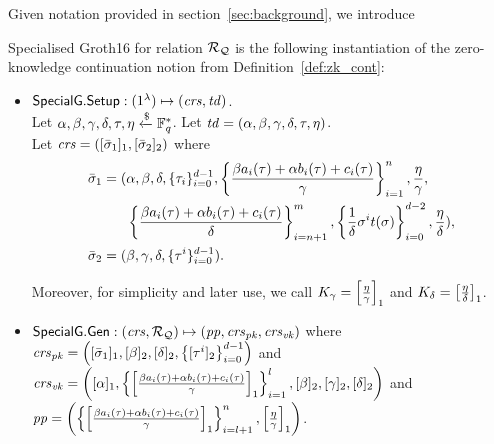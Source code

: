 \noindent Given notation provided in section~\ref{sec:background}, we introduce

\begin{definition}
\label{insta:sg16} 
Specialised Groth16 for relation $\mathcal{R}_{\mathcal{Q}}$ is the following instantiation of the zero-knowledge continuation notion from Definition~\ref{def:zk_cont}:
\begin{itemize}
\item ${\mathsf{SpecialG}}.{\mathsf{Setup}}: (1^{\lambda}) \mapsto (\mathit{crs}, \mathit{td})$. \\ 
\noindent Let $\alpha, \beta, \gamma, \delta, \tau, \eta  \xleftarrow{\$} \mathbb{F}_q^{*}$. Let $\mathit{td} = (\alpha, \beta, \gamma, \delta, \tau, \eta)$. \\ 
Let $\mathit{crs} = ([\bar{\sigma}_1]_1, [\bar{\sigma}_2]_2)$ where 
\begin{align*}
\bar{\sigma}_1 = (&\alpha, \beta, \delta, \{\tau_i\}_{i=0}^{d-1}, \left\{\frac{\beta a_i(\tau)+ \alpha b_i(\tau)+ c_i(\tau)}{\gamma}\right\}_{i=1}^n,  
\frac{\eta}{\gamma}, \\ 
&\left\{\frac{\beta a_i(\tau)+ \alpha b_i(\tau)+ c_i(\tau)}{\delta} \right\}_{i=n+1}^m, \left\{\frac{1}{\delta}\sigma^it(\sigma) \right\}_{i=0}^{d-2}, 
\frac{\eta}{\delta}), \\
\bar{\sigma}_2 = (&\beta, \gamma, \delta, \{\tau^i\}_{i=0}^{d-1}). 
\end{align*} 

\noindent Moreover, for simplicity and later use, we call $K_{\gamma} = \left[\frac{\eta}{\gamma}\right]_1$  and $K_{\delta} = \left[ \frac{\eta}{\delta}\right] _1$.

\item ${\mathsf{SpecialG}}.\mathsf{Gen}: (\mathit{crs}, \mathcal{R}_{\mathcal{Q}}) \mapsto (\mathit{pp}, \mathit{crs}_{\mathit{pk}}, \mathit{crs}_{\mathit{vk}})$ where \\
$\mathit{crs}_{\mathit{pk}} = \left([\bar{\sigma}_1]_1, [\beta]_2, [\delta]_2, \left\{[\tau^i]_2\right\}_{i=0}^{d-1}\right)$ and \\ 
$\mathit{crs}_{\mathit{vk}} = \left([\alpha]_1, \left\{ \left[ \frac{\beta a_i(\tau)+ \alpha b_i(\tau)+ c_i(\tau)}{\gamma} \right]_1 \right\}_{i=1}^{l}, 
[\beta]_2, [\gamma]_2, [\delta]_2\right)$ and \\ 
$\mathit{pp} = \left( \left \{ \left[ \frac{\beta a_i(\tau)+ \alpha b_i(\tau)+ c_i(\tau)}{\gamma} \right]_1 \right \}_{i=l+1}^{n}, \left[ \frac{\eta}{\gamma} \right]_1 \right)$.



\end{itemize}
\end{definition}
